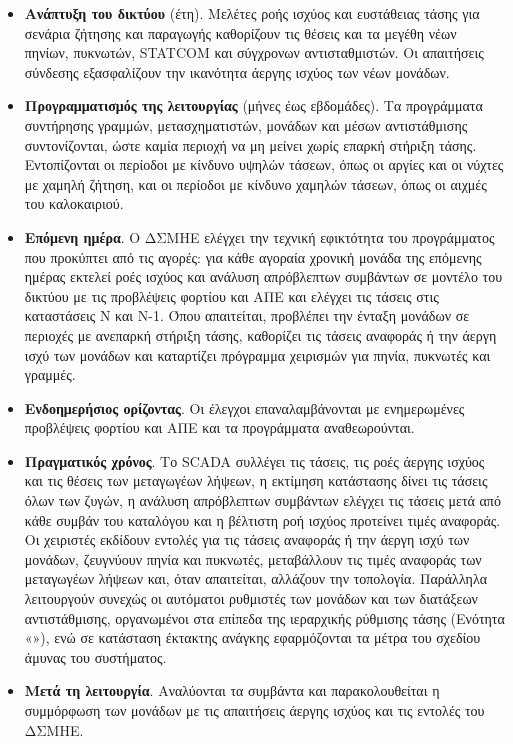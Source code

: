 \begin{itemize}
\item \textbf{Ανάπτυξη του δικτύου} (έτη). Μελέτες ροής ισχύος και ευστάθειας τάσης για
      σενάρια ζήτησης και παραγωγής καθορίζουν τις θέσεις και τα μεγέθη νέων πηνίων, πυκνωτών,
      STATCOM και σύγχρονων αντισταθμιστών. Οι απαιτήσεις σύνδεσης εξασφαλίζουν την ικανότητα
      άεργης ισχύος των νέων μονάδων.
\item \textbf{Προγραμματισμός της λειτουργίας} (μήνες έως εβδομάδες). Τα προγράμματα
      συντήρησης γραμμών, μετασχηματιστών, μονάδων και μέσων αντιστάθμισης συντονίζονται,
      ώστε καμία περιοχή να μη μείνει χωρίς επαρκή στήριξη τάσης. Εντοπίζονται οι περίοδοι με
      κίνδυνο υψηλών τάσεων, όπως οι αργίες και οι νύχτες με χαμηλή ζήτηση, και οι περίοδοι με
      κίνδυνο χαμηλών τάσεων, όπως οι αιχμές του καλοκαιριού.
\item \textbf{Επόμενη ημέρα}. Ο ΔΣΜΗΕ ελέγχει την τεχνική εφικτότητα του προγράμματος που
      προκύπτει από τις αγορές: για κάθε αγοραία χρονική μονάδα της επόμενης ημέρας εκτελεί
      ροές ισχύος και ανάλυση απρόβλεπτων συμβάντων σε μοντέλο του δικτύου με τις προβλέψεις φορτίου
      και ΑΠΕ και ελέγχει τις τάσεις στις καταστάσεις N και N-1. Όπου απαιτείται, προβλέπει την
      ένταξη μονάδων σε περιοχές με ανεπαρκή στήριξη τάσης, καθορίζει τις τάσεις αναφοράς ή την
      άεργη ισχύ των μονάδων και καταρτίζει πρόγραμμα χειρισμών για πηνία, πυκνωτές και
      γραμμές.
\item \textbf{Ενδοημερήσιος ορίζοντας}. Οι έλεγχοι επαναλαμβάνονται με ενημερωμένες
      προβλέψεις φορτίου και ΑΠΕ και τα προγράμματα αναθεωρούνται.
\item \textbf{Πραγματικός χρόνος}. Το SCADA συλλέγει τις τάσεις, τις ροές άεργης ισχύος και τις
      θέσεις των μεταγωγέων λήψεων, η εκτίμηση κατάστασης δίνει τις τάσεις όλων των ζυγών, η
      ανάλυση απρόβλεπτων συμβάντων ελέγχει τις τάσεις μετά από κάθε συμβάν του καταλόγου και
      η βέλτιστη ροή ισχύος προτείνει τιμές αναφοράς. Οι χειριστές εκδίδουν εντολές για τις
      τάσεις αναφοράς ή την άεργη ισχύ των μονάδων, ζευγνύουν πηνία και πυκνωτές, μεταβάλλουν
      τις τιμές αναφοράς των μεταγωγέων λήψεων και, όταν απαιτείται, αλλάζουν την τοπολογία.
      Παράλληλα λειτουργούν συνεχώς οι αυτόματοι ρυθμιστές των μονάδων και των διατάξεων
      αντιστάθμισης, οργανωμένοι στα επίπεδα της ιεραρχικής ρύθμισης τάσης (Ενότητα
      «»), ενώ σε κατάσταση έκτακτης ανάγκης εφαρμόζονται τα μέτρα του
      σχεδίου άμυνας του συστήματος.
\item \textbf{Μετά τη λειτουργία}. Αναλύονται τα συμβάντα και παρακολουθείται η συμμόρφωση των
      μονάδων με τις απαιτήσεις άεργης ισχύος και τις εντολές του ΔΣΜΗΕ.
\end{itemize}

